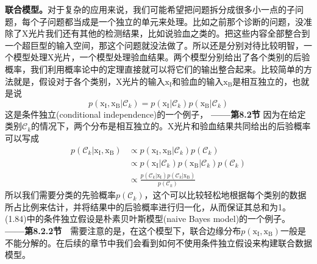 \documentclass[b5paper]{book}
\numberwithin{equation}{chapter}
\begin{document}
{	\indent \textbf{联合模型。}对于复杂的应用来说，我们可能希望把问题拆分成很多小一点的子问题，每个子问题都当成是一个独立的单元来处理。比如之前那个诊断的问题，没准除了X光片我们还有其他的检测结果，比如说验血之类的。把这些内容全部整合到一个超巨型的输入空间，那这个问题就没法做了。所以还是分别对待比较明智，一个模型处理X光片，一个模型处理验血结果。两个模型分别给出了各个类别的后验概率，我们利用概率论中的定理直接就可以将它们的输出整合起来。比较简单的方法就是，假设对于各个类别，X光片的输入$\boldsymbol{\mathrm{x}}_\mathrm{I}$和验血的输入$\boldsymbol{\mathrm{x}}_\mathrm{B}$是相互独立的，也就是说
	\begin{equation}
		p(\boldsymbol{\mathrm{x}}_\mathrm{I},\boldsymbol{\mathrm{x}}_\mathrm{B}|\mathcal{C}_k)=p(\boldsymbol{\mathrm{x}}_\mathrm{I}|\mathcal{C}_k)p(\boldsymbol{\mathrm{x}}_\mathrm{B}|\mathcal{C}_k)
	\end{equation}
	这是条件独立(conditional independence)的一个例子，\color{red} \textbf{——第8.2节} \color{black}因为在给定类别$\mathcal{C}_k$的情况下，两个分布是相互独立的。X光片和验血结果共同给出的后验概率可以写成
	\begin{equation}
	\begin{split}
		p(\mathcal{C}_k|\boldsymbol{\mathrm{x}}_\mathrm{I},\boldsymbol{\mathrm{x}}_\mathrm{B}) &\propto p(\boldsymbol{\mathrm{x}}_\mathrm{I},\boldsymbol{\mathrm{x}}_\mathrm{B}|\mathcal{C}_k)p(\mathcal{C}_k) \\
		&\propto p(\boldsymbol{\mathrm{x}}_\mathrm{I}|\mathcal{C}_k)p(\boldsymbol{\mathrm{x}}_\mathrm{B}|\mathcal{C}_k)p(\mathcal{C}_k)\\
		&\propto \frac{p(\mathcal{C}_k|\boldsymbol{\mathrm{x}}_\mathrm{I})p(\mathcal{C}_k|\boldsymbol{\mathrm{x}}_\mathrm{B})}{p(\mathcal{C}_k)}
	\end{split} 
	\end{equation}
	所以我们需要分类的先验概率$p(\mathcal{C}_k)$，这个可以比较轻松地根据每个类别的数据所占比例来估计，并将结果中的后验概率进行归一化，从而保证其总和为1。(1.84)中的条件独立假设是朴素贝叶斯模型(naive Bayes model)的一个例子。\color{red} \textbf{——第8.2.2节}　\color{black}需要注意的是，在这个模型下，联合边缘分布$p(\boldsymbol{\mathrm{x}}_\mathrm{I},\boldsymbol{\mathrm{x}}_\mathrm{B})$一般是不能分解的。在后续的章节中我们会看到如何不使用条件独立假设来构建联合数据模型。
	}
\end{document}
